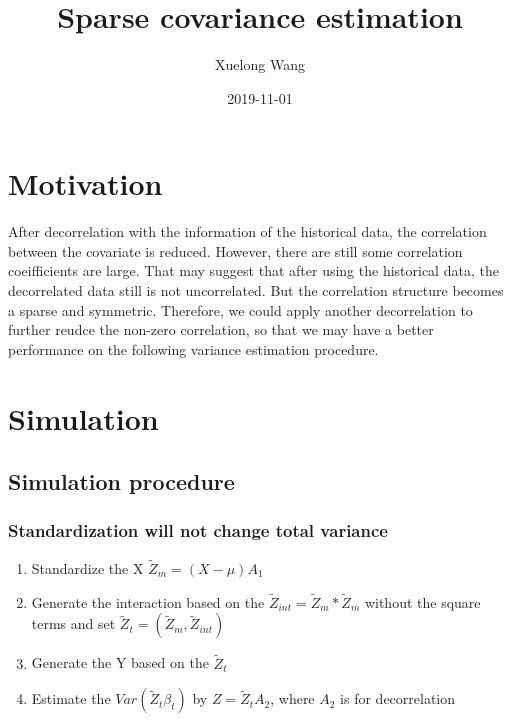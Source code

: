 \documentclass[]{article}
\title{Sparse covariance estimation}
\author{Xuelong Wang}
\date{2019-11-01}
\providecommand{\tightlist}{%
  \setlength{\itemsep}{0pt}\setlength{\parskip}{0pt}}
\begin{document}
\maketitle

{
\setcounter{tocdepth}{2}
\tableofcontents
}
\section{Motivation}\label{motivation}

After decorrelation with the information of the historical data, the
correlation between the covariate is reduced. However, there are still
some correlation coeifficients are large. That may suggest that after
using the historical data, the decorrelated data still is not
uncorrelated. But the correlation structure becomes a sparse and
symmetric. Therefore, we could apply another decorrelation to further
reudce the non-zero correlation, so that we may have a better
performance on the following variance estimation procedure.

\section{Simulation}\label{simulation}

\subsection{Simulation procedure}\label{simulation-procedure}

\subsubsection{Standardization will not change total
variance}\label{standardization-will-not-change-total-variance}

\begin{enumerate}
\def\labelenumi{\arabic{enumi}.}
\tightlist
\item
  Standardize the X \(\tilde{Z}_m = (X-\mu)A_1\)
\item
  Generate the interaction based on the
  \(\tilde{Z}_{int} = \tilde{Z}_m*\tilde{Z}_m\) without the square terms
  and set \(\tilde{Z}_t = (\tilde{Z}_m, \tilde{Z}_{int})\)
\item
  Generate the Y based on the \(\tilde{Z}_t\)
\item
  Estimate the \(Var(\tilde{Z}_t \beta_t)\) by \(Z = \tilde{Z}_tA_2\),
  where \(A_2\) is for decorrelation
\end{enumerate}
\end{document}
